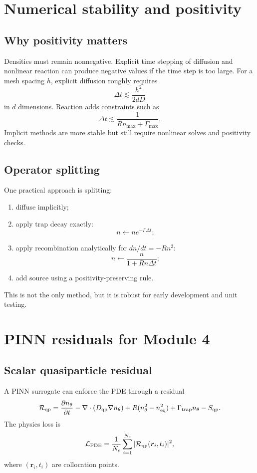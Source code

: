 \documentclass[11pt]{article}
\newcommand{\br}{{\bm{r}}}
\newcommand{\trap}{\mathrm{trap}}
\newcommand{\eq}{\mathrm{eq}}
\begin{document}
\section{Numerical stability and positivity}

\subsection{Why positivity matters}
Densities must remain nonnegative. Explicit time stepping of diffusion and nonlinear reaction can produce negative values if the time step is too large. For a mesh spacing $h$, explicit diffusion roughly requires
\begin{equation}
\Delta t\lesssim \frac{h^2}{2dD}
\end{equation}
in $d$ dimensions. Reaction adds constraints such as
\begin{equation}
\Delta t\lesssim\frac{1}{Rn_{\max}+\Gamma_{\max}}.
\end{equation}
Implicit methods are more stable but still require nonlinear solves and positivity checks.

\subsection{Operator splitting}
One practical approach is splitting:
\begin{enumerate}[leftmargin=1.6em]
    \item diffuse implicitly;
    \item apply trap decay exactly:
    \begin{equation}
    n\leftarrow n e^{-\Gamma\Delta t};
    \end{equation}
    \item apply recombination analytically for $dn/dt=-Rn^2$:
    \begin{equation}
    n\leftarrow\frac{n}{1+Rn\Delta t};
    \end{equation}
    \item add source using a positivity-preserving rule.
\end{enumerate}
This is not the only method, but it is robust for early development and unit testing.

\section{PINN residuals for Module 4}

\subsection{Scalar quasiparticle residual}
A PINN surrogate can enforce the PDE through a residual
\begin{equation}
\mathcal{R}_{\qp}
=\frac{\partial n_{\theta}}{\partial t}
-\nabla\cdot(D_{\qp}\nabla n_{\theta})
+R(n_{\theta}^2-n_{\eq}^2)
+\Gamma_{\trap}n_{\theta}
-S_{\qp}.
\end{equation}
The physics loss is
\begin{equation}
\mathcal{L}_{\mathrm{PDE}}=\frac{1}{N_c}\sum_{i=1}^{N_c}|\mathcal{R}_{\qp}(\br_i,t_i)|^2,
\end{equation}
where $(\br_i,t_i)$ are collocation points.
\end{document}
